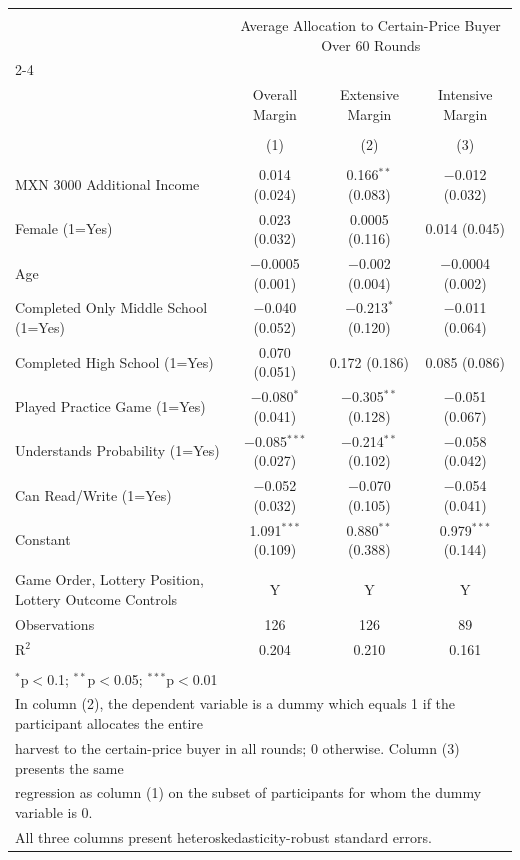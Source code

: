 
\begin{table}[!htbp] \centering 
   
   
\begin{tabular}{@{\extracolsep{5pt}}lccc} 
\\[-1.8ex]\hline 
\hline \\[-1.8ex] 
 & \multicolumn{3}{c}{Average Allocation to Certain-Price Buyer Over 60 Rounds} \\ 
\cline{2-4} 
\\[-1.8ex] & Overall Margin & Extensive Margin & Intensive Margin \\ 
\\[-1.8ex] & (1) & (2) & (3)\\ 
\hline \\[-1.8ex] 
 MXN 3000 Additional Income & 0.014 (0.024) & 0.166$^{**}$ (0.083) & $-$0.012 (0.032) \\ 
  Female (1=Yes) & 0.023 (0.032) & 0.0005 (0.116) & 0.014 (0.045) \\ 
  Age & $-$0.0005 (0.001) & $-$0.002 (0.004) & $-$0.0004 (0.002) \\ 
  Completed Only Middle School (1=Yes) & $-$0.040 (0.052) & $-$0.213$^{*}$ (0.120) & $-$0.011 (0.064) \\ 
  Completed High School (1=Yes) & 0.070 (0.051) & 0.172 (0.186) & 0.085 (0.086) \\ 
  Played Practice Game (1=Yes) & $-$0.080$^{*}$ (0.041) & $-$0.305$^{**}$ (0.128) & $-$0.051 (0.067) \\ 
  Understands Probability (1=Yes) & $-$0.085$^{***}$ (0.027) & $-$0.214$^{**}$ (0.102) & $-$0.058 (0.042) \\ 
  Can Read/Write (1=Yes) & $-$0.052 (0.032) & $-$0.070 (0.105) & $-$0.054 (0.041) \\ 
  Constant & 1.091$^{***}$ (0.109) & 0.880$^{**}$ (0.388) & 0.979$^{***}$ (0.144) \\ 
 \hline \\[-1.8ex] 
Game Order, Lottery Position, Lottery Outcome Controls & Y & Y & Y \\ 
Observations & 126 & 126 & 89 \\ 
R$^{2}$ & 0.204 & 0.210 & 0.161 \\ 
\hline 
\hline \\[-1.8ex] 
\multicolumn{4}{l}{$^{*}$p$<$0.1; $^{**}$p$<$0.05; $^{***}$p$<$0.01} \\ 
\multicolumn{4}{l}{In column (2), the dependent variable is a dummy which equals 1 if the participant allocates the entire} \\ 
\multicolumn{4}{l}{harvest to the certain-price buyer in all rounds; 0 otherwise. Column (3) presents the same} \\ 
\multicolumn{4}{l}{regression as column (1) on the subset of participants for whom the dummy variable is 0.} \\ 
\multicolumn{4}{l}{All three columns present heteroskedasticity-robust standard errors.} \\ 
\end{tabular} 
\end{table} 
